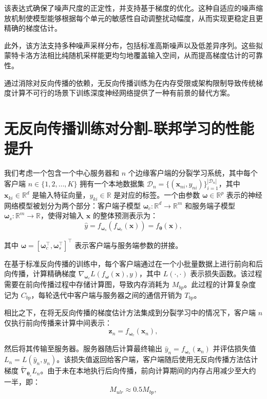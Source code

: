 该表达式确保了噪声尺度的正定性，并支持基于梯度的优化。这种自适应的噪声缩放机制使模型能够根据每个单元的敏感性自动调整扰动幅度，从而实现更稳定且更精确的梯度估计。

此外，该方法支持多种噪声采样分布，包括标准高斯噪声以及低差异序列。这些拟蒙特卡洛方法相比纯随机采样能更均匀地覆盖输入空间，从而提高梯度估计的可靠性。

通过消除对反向传播的依赖，无反向传播训练为在内存受限或架构限制导致传统梯度计算不可行的场景下训练深度神经网络提供了一种有前景的替代方案。

\section{无反向传播训练对分割-联邦学习的性能提升}
我们考虑一个包含一个中心服务器和 $ n $ 个边缘客户端的分裂学习系统，其中每个客户端 $ n \in \{1, 2, \dots, K\} $ 拥有一个本地数据集 $ \mathcal{D}_n = \{(\mathbf{x}_{ni}, y_{ni})\}_{i=1}^{|\mathcal{D}_n|} $，其中 $ \mathbf{x}_{ki} \in \mathbb{R}^d $ 是输入特征向量，$ y_{ki} \in \mathbb{R} $ 是对应的标签。一个由参数 $ \boldsymbol{\omega} \in \mathbb{R}^p $ 表示的神经网络模型被划分为两个部分：客户端子模型 $ \boldsymbol{\omega}_c: \mathbb{R}^d \rightarrow \mathbb{R}^m $ 和服务端子模型 $ \boldsymbol{\omega}_s: \mathbb{R}^m \rightarrow \mathbb{R} $，使得对输入 $ \mathbf{x} $ 的整体预测表示为：
\begin{equation}
    \hat{y} = f_{\boldsymbol{\omega}_s}(f_{\boldsymbol{\omega}_c}(\mathbf{x})) = f_{\boldsymbol{\theta}}(\mathbf{x}),
\end{equation}


其中 $ \boldsymbol{\omega} = [\boldsymbol{\omega}_c^\top, \boldsymbol{\omega}_s^\top]^\top $ 表示客户端与服务端参数的拼接。

在基于标准反向传播的训练中，每个客户端通过在一个小批量数据上进行前向和后向传播，计算精确梯度 $ \nabla_{\boldsymbol{\omega}_c} L(f_{\boldsymbol{\omega}}(\mathbf{x}), y) $，其中 $ L(\cdot, \cdot) $ 表示损失函数。该过程需要在前向传播过程中存储计算图，导致内存消耗为 $ M_{bp} $。此过程的计算复杂度记为 $ C_{bp} $，每轮迭代中客户端与服务器之间的通信开销为 $ T_{bp} $。

相比之下，在将无反向传播的梯度估计方法集成到分裂学习中的情况下，客户端 $n$ 仅执行前向传播来计算中间表示：
\begin{equation}
    \mathbf{z}_n = f_{\boldsymbol{\omega}_c}(\mathbf{x}_n),
\end{equation}


然后将其传输至服务器。服务器随后计算最终输出 $ \hat{y}_n = f_{\boldsymbol{\omega}_s}(\mathbf{z}_n) $ 并评估损失值 $ L_n = L(\hat{y}_n, y_n) $。该损失值返回给客户端，客户端随后使用无反向传播方法估计梯度 $ \tilde{\nabla}_{\boldsymbol{\theta}_c} L_n $。由于未在本地执行后向传播，前向计算期间的内存占用减少至大约一半，即：
\begin{equation}
    M_{ulr} \approx 0.5 M_{bp},
\end{equation}


